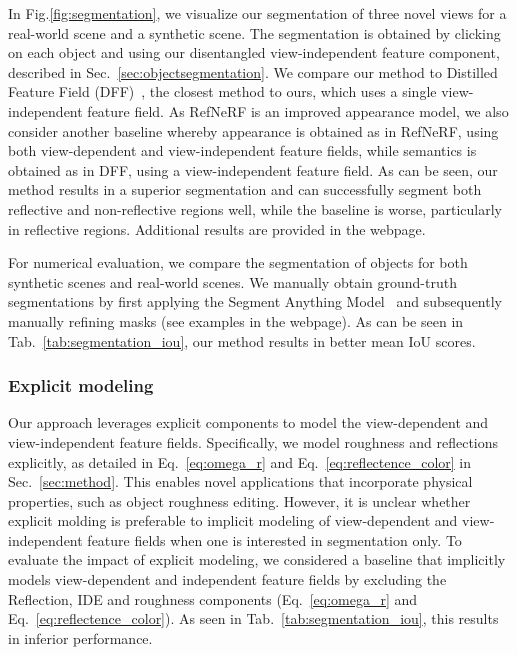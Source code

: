 In Fig.\ref{fig:segmentation}, we visualize our segmentation of three novel views for a real-world scene and a synthetic scene. The segmentation is obtained by clicking on each object and using our disentangled view-independent feature component, described in Sec.~\ref{sec:objectsegmentation}. We compare our method to Distilled Feature Field (DFF)~\cite{kobayashi2022decomposing}, the closest method to ours, which uses a single view-independent feature field. As RefNeRF is an improved appearance model, we also consider another baseline whereby appearance is obtained as in RefNeRF, using both view-dependent and view-independent feature fields, while semantics is obtained as in DFF, using a view-independent feature field. 
As can be seen, our method results in a superior segmentation and can successfully segment both reflective and non-reflective regions well, while the baseline is worse, particularly in reflective regions. Additional results are provided in the webpage. 


For numerical evaluation, we compare the segmentation of objects for both synthetic scenes and real-world scenes. We manually obtain ground-truth segmentations by first applying the Segment Anything Model~\cite{kirillov2023segment} and subsequently manually refining masks (see examples in the webpage). 
As can be seen in Tab.~\ref{tab:segmentation_iou}, our method results in better mean IoU scores. 


\subsubsection{Explicit modeling}
Our approach leverages explicit components to model the view-dependent and view-independent feature fields. Specifically, we model roughness and reflections explicitly, as detailed in Eq.~\ref{eq:omega_r} and Eq.~\ref{eq:reflectence_color} in Sec.~\ref{sec:method}. This enables novel applications that incorporate physical properties, such as object roughness editing. However, it is unclear whether explicit molding is preferable to implicit modeling of view-dependent and view-independent feature fields when one is interested in segmentation only. 
To evaluate the impact of explicit modeling, we considered a baseline that implicitly models view-dependent and independent feature fields by excluding the Reflection, IDE and roughness components (Eq.~\ref{eq:omega_r} and Eq.~\ref{eq:reflectence_color}). 
As seen in Tab.~\ref{tab:segmentation_iou}, this results in inferior performance. 





